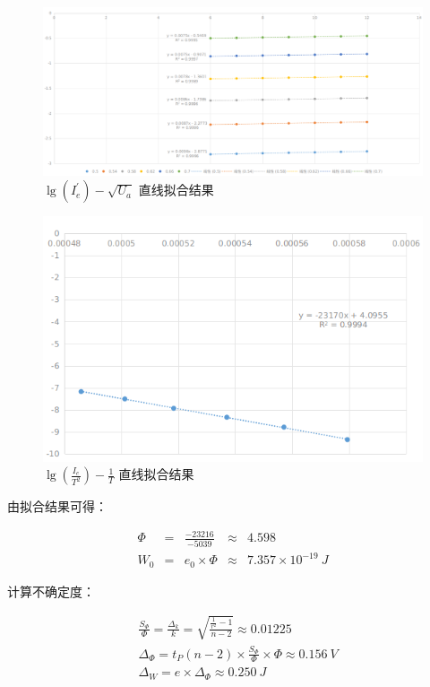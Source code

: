 \documentclass[a4paper]{article}
\begin{document}
\begin{figure}[H]
	\centering
	\includegraphics[width=0.9\linewidth]{figures/f1}
    \caption{$\lg(I_e^\prime)-\sqrt{U_a}$ 直线拟合结果}
\end{figure}

\begin{figure}[H]
	\centering
	\includegraphics[width=0.9\linewidth]{figures/f2}
    \caption{$\lg(\frac{I_e}{T^2})-\frac{1}{T}$ 直线拟合结果}
\end{figure}

\par 由拟合结果可得：

$$
\begin{array}{rcccl}
	\Phi&=&\frac{-23216}{-5039}&\approx&4.598\\
	W_0&=&e_0\times \Phi&\approx&7.357\times 10^{-19}\ J
\end{array}
$$

\par 计算不确定度：

$$
\begin{array}{cl}
	&\frac{S_\Phi}{\Phi}=\frac{\Delta_k}{k}=\sqrt{\frac{\frac{1}{r^2}-1}{n-2}}\approx 0.01225\\
	&\Delta_\Phi=t_P(n-2)\times \frac{S_\Phi}{\Phi}\times \Phi\approx 0.156\ V\\
	&\Delta_W=e\times\Delta_\Phi\approx 0.250\ J
\end{array}
$$
\end{document}
